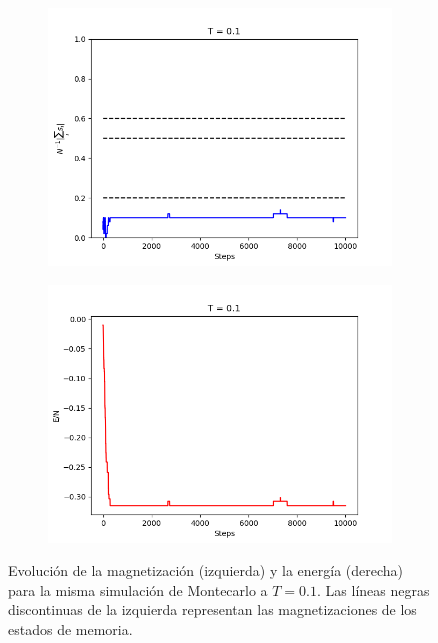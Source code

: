 \documentclass[titlepage,12pt]{article}
\numberwithin{equation}{section}
\begin{document}
	\begin{figure}[H]
	    \centering
	    \begin{subfigure}{.45\textwidth}
	    \centering
	    \includegraphics[width=\linewidth]{magnet_meta_T=0,1.png}
	    \end{subfigure}%
	    \begin{subfigure}{.45\linewidth}
	    \centering
	    \includegraphics[width=\linewidth]{ener_meta_T=0,1.png}
	    \end{subfigure}%
	    \caption{Evolución de la magnetización (izquierda) y la energía (derecha) para la misma simulación de Montecarlo a $T = 0.1$. Las líneas negras discontinuas de la izquierda representan las magnetizaciones de los estados de memoria.}
	    \label{meta-T=0.1}
	\end{figure}
\end{document}
